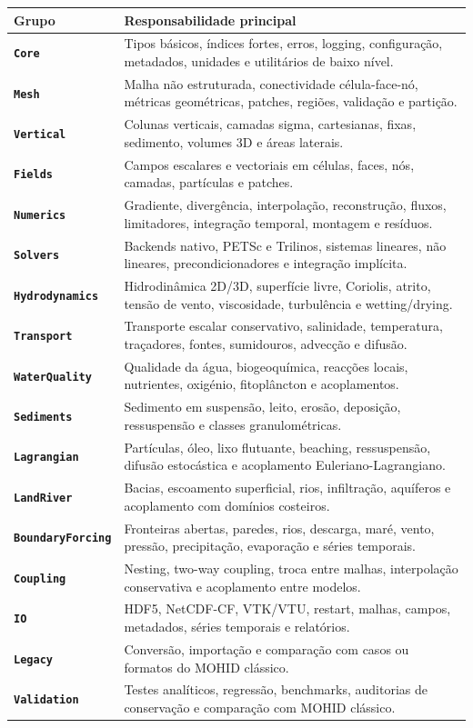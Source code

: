 \documentclass[11pt,a4paper]{article}
\begin{document}
\begin{tabularx}{\textwidth}{>{\sffamily\bfseries}p{}X}
\toprule
Grupo & Responsabilidade principal \\
\midrule
\texttt{Core} & Tipos básicos, índices fortes, erros, logging, configuração, metadados, unidades e utilitários de baixo nível. \\
\texttt{Mesh} & Malha não estruturada, conectividade célula-face-nó, métricas geométricas, patches, regiões, validação e partição. \\
\texttt{Vertical} & Colunas verticais, camadas sigma, cartesianas, fixas, sedimento, volumes 3D e áreas laterais. \\
\texttt{Fields} & Campos escalares e vectoriais em células, faces, nós, camadas, partículas e patches. \\
\texttt{Numerics} & Gradiente, divergência, interpolação, reconstrução, fluxos, limitadores, integração temporal, montagem e resíduos. \\
\texttt{Solvers} & Backends nativo, PETSc e Trilinos, sistemas lineares, não lineares, precondicionadores e integração implícita. \\
\texttt{Hydrodynamics} & Hidrodinâmica 2D/3D, superfície livre, Coriolis, atrito, tensão de vento, viscosidade, turbulência e wetting/drying. \\
\texttt{Transport} & Transporte escalar conservativo, salinidade, temperatura, traçadores, fontes, sumidouros, advecção e difusão. \\
\texttt{WaterQuality} & Qualidade da água, biogeoquímica, reacções locais, nutrientes, oxigénio, fitoplâncton e acoplamentos. \\
\texttt{Sediments} & Sedimento em suspensão, leito, erosão, deposição, ressuspensão e classes granulométricas. \\
\texttt{Lagrangian} & Partículas, óleo, lixo flutuante, beaching, ressuspensão, difusão estocástica e acoplamento Euleriano-Lagrangiano. \\
\texttt{LandRiver} & Bacias, escoamento superficial, rios, infiltração, aquíferos e acoplamento com domínios costeiros. \\
\texttt{BoundaryForcing} & Fronteiras abertas, paredes, rios, descarga, maré, vento, pressão, precipitação, evaporação e séries temporais. \\
\texttt{Coupling} & Nesting, two-way coupling, troca entre malhas, interpolação conservativa e acoplamento entre modelos. \\
\texttt{IO} & HDF5, NetCDF-CF, VTK/VTU, restart, malhas, campos, metadados, séries temporais e relatórios. \\
\texttt{Legacy} & Conversão, importação e comparação com casos ou formatos do MOHID clássico. \\
\texttt{Validation} & Testes analíticos, regressão, benchmarks, auditorias de conservação e comparação com MOHID clássico. \\
\bottomrule
\end{tabularx}
\end{document}

